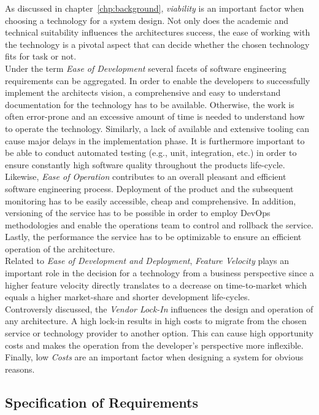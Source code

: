 As discussed in chapter~\vref{chp:background}, \textit{viability} is an important factor when choosing a technology for a system design. Not only does the academic and technical suitability influences the architectures success, the ease of working with the technology is a pivotal aspect that can decide whether the chosen technology fits for task or not.\\
Under the term \textit{Ease of Development} several facets of software engineering requirements can be aggregated. In order to enable the developers to successfully implement the architects vision, a comprehensive and easy to understand documentation for the technology has to be available. Otherwise, the work is often error-prone and an excessive amount of time is needed to understand how to operate the technology. Similarly, a lack of available and extensive tooling can cause major delays in the implementation phase. It is furthermore important to be able to conduct automated testing (e.g., unit, integration, etc.) in order to ensure constantly high software quality throughout the products life-cycle.\\
Likewise, \textit{Ease of Operation} contributes to an overall pleasant and efficient software engineering process. Deployment of the product and the subsequent monitoring has to be easily accessible, cheap and comprehensive. In addition, versioning of the service has to be possible in order to employ DevOps methodologies and enable the operations team to control and rollback the service. Lastly, the performance the service has to be optimizable to ensure an efficient operation of the architecture.\\
Related to \textit{Ease of Development and Deployment}, \textit{Feature Velocity} plays an important role in the decision for a technology from a business perspective since a higher feature velocity directly translates to a decrease on time-to-market which equals a higher market-share and shorter development life-cycles.\\
Controversly discussed, the \textit{Vendor Lock-In} influences the design and operation of any architecture. A high lock-in results in high costs to migrate from the chosen service or technology provider to another option. This can cause high opportunity costs and makes the operation from the developer's perspective more inflexible. \\
Finally, low \textit{Costs} are an important factor when designing a system for obvious reasons. 

\subsection{Specification of Requirements}

